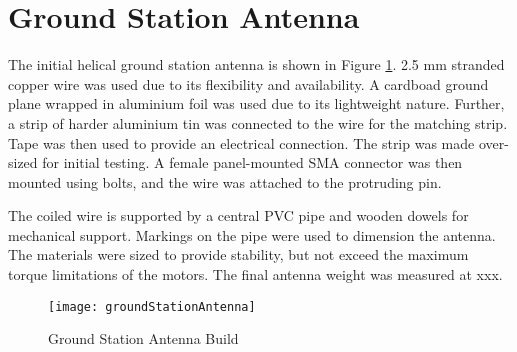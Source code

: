 \graphicspath{{./figures}}

\section{Ground Station Antenna}

The initial helical ground station antenna is shown in Figure \ref{fig:groundStationAntenna}. 2.5 mm stranded copper wire was used due to its flexibility and availability. A cardboad ground plane wrapped in aluminium foil was used due to its lightweight nature. Further, a strip of harder aluminium tin was connected to the wire for the matching strip. Tape was then used to provide an electrical connection. The strip was made over-sized for initial testing. A female panel-mounted SMA connector was then mounted using bolts, and the wire was attached to the protruding pin.

The coiled wire is supported by a central PVC pipe and wooden dowels for mechanical support. Markings on the pipe were used to dimension the antenna. The materials were sized to provide stability, but not exceed the maximum torque limitations of the motors. The final antenna weight was measured at xxx.

\begin{figure}[!htb]
  \centering
  \texttt{[image: groundStationAntenna]}
  \caption{Ground Station Antenna Build}
  \label{fig:groundStationAntenna}
\end{figure}